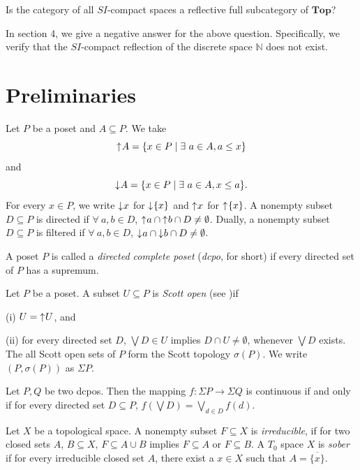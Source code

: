 \documentclass[preprint,12pt]{elsarticle}
\numberwithin{equation}{section}
\newcommand{\dn}{\mathord{\downarrow}\hspace{0.05em}}
\newcommand{\up}{\mathord{\uparrow}\hspace{0.05em}}
\begin{document}
Is the category of all $SI$-compact spaces a reflective full subcategory of $\mathbf{Top}$?

In section 4, we give a negative answer for the above question. Specifically, we verify that the $SI$-compact reflection of the discrete space $\mathbb{N}$ does not exist.



















\section{Preliminaries}
\label{}

\quad Let $P$ be a poset and $A\subseteq P$. We take $$\up A=\{x\in P\mid \exists\ a\in A, a\leq x \}$$ and $$\dn A=\{x\in P\mid \exists\ a\in A, x\leq a\}.$$
For every $x\in P$, we write $\dn x$ for $\dn\{x\}$  and $\up x$ for $\up\{x\}$. A nonempty subset $D\subseteq P$ is directed if $\forall\ a,b\in D$, $\up a\cap \up b \cap D\neq\emptyset$. Dually, a nonempty subset $D\subseteq P$ is filtered if $\forall\ a,b\in D$, $\dn a\cap \dn b \cap D\neq\emptyset$.

\quad A poset $P$ is called a {\em directed complete poset} ({\em  dcpo}, for short) if every
directed set of $P$ has a supremum.


\quad Let $P$ be a poset. A subset $U\subseteq P$ is {\em Scott open} (see \cite{GG03,JG13})if

 (i) $U=\up U$, and

 (ii) for every directed set $D$, $\bigvee D\in U$ implies
$D\cap U\neq \emptyset$, whenever $\bigvee D$ exists.\\
The all Scott open sets of $P$ form the Scott topology $\sigma(P)$. We write $(P,\sigma(P))$ as $\Sigma P$.

\quad Let $P,Q$ be two dcpos. Then the mapping $f:\Sigma P\longrightarrow \Sigma Q$ is continuous if and only if for every directed set $D\subseteq P$, $f(\bigvee D)=\bigvee\limits_{d\in D}f(d)$.

\quad Let $X$ be a topological space. A nonempty subset $F\subseteq X$ is {\em irreducible},
if for two closed sets $A$, $B\subseteq X$, $F\subseteq A\cup B$ implies $F\subseteq A$ or $F\subseteq B$. A $T_{0}$ space $X$ is {\em sober} if for every irreducible closed set $A$, there exist a $x\in X$ such that $A=\overline{\{x\}}$.
\end{document}
